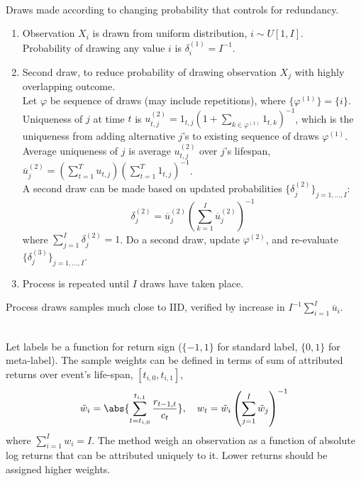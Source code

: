 \begin{method} \\
Draws made according to changing probability that controls for redundancy.
\begin{enumerate}[label=\roman*.]
\setlength{\itemsep}{0pt}
\item Observation $X_i$ is drawn from uniform distribution, $i \sim U[1, I]$.\\
Probability of drawing any value $i$ is $\delta^{(1)}_i = I^{-1}$.
\item Second draw, to reduce probability of drawing observation $X_j$ with highly overlapping outcome.\\
Let $\varphi$ be sequence of draws (may include repetitions), where $\{\varphi^{(1)}\} = \{i\}$.\\
Uniqueness of $j$ at time $t$ is $u^{(2)}_{t,j} = 1_{t,j} (1 + \sum_{k \in \varphi^{(1)}} 1_{t,k})^{-1}$, which is the uniqueness from adding alternative $j$'s to existing sequence of draws $\varphi^{(1)}$.\\
Average uniqueness of $j$ is average $u^{(2)}_{t,j}$ over $j$'s lifespan, $\overline{u}^{(2)}_j = (\sum_{t=1}^T u_{t,j}) (\sum_{t=1}^T 1_{t,j})^{-1}$.\\
A second draw can be made based on updated probabilities $\{\delta^{(2)}_j\}_{j = 1, \ldots, I}$:
\begin{equation*}
\delta^{(2)}_j = \overline{u}^{(2)}_j \left( \sum\limits_{k=1}^I \overline{u}^{(2)}_j \right)^{-1} \nonumber
\end{equation*}
where $\sum_{j=1}^I \delta^{(2)}_j = 1$.
Do a second draw, update $\varphi^{(2)}$, and re-evaluate $\{\delta^{(3)}_j \}_{j=1, \ldots, I}$.
\item Process is repeated until $I$ draws have taken place.
\end{enumerate}
Process draws samples much close to IID, verified by increase in $I^{-1} \sum_{i=1}^I \overline{u}_i$.
\end{method}

\begin{method} \\
Let labels be a function for return sign ($\{-1, 1\}$ for standard label, $\{0, 1\}$ for meta-label). The sample weights can be defined in terms of sum of attributed returns over event's life-span, $[t_{i,0}, t_{i,1}]$,
\begin{equation*}
\tilde{w}_{i} = \abs{\sum\limits_{t = t_{i,0}}^{t_{i,1}} \frac{r_{t-1, t}}{c_t}}, \ \ \ w_t = \tilde{w}_{i} \left( \sum\limits_{j=1}^I \tilde{w}_j \right)^{-1} \nonumber
\end{equation*}
where $\sum_{i=1}^I w_i = I$. The method weigh an observation as a function of absolute log returns that can be attributed uniquely to it. Lower returns should be assigned higher weights.
\end{method}

